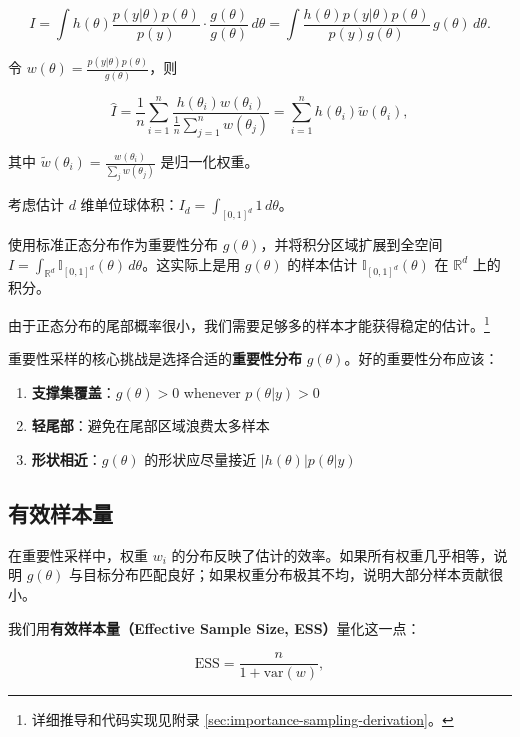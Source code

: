 \[
I = \int h(\theta) \frac{p(y | \theta) p(\theta)}{p(y)} \cdot \frac{g(\theta)}{g(\theta)} \, d\theta
    = \int \frac{h(\theta) p(y | \theta) p(\theta)}{p(y) g(\theta)} \, g(\theta) \, d\theta.
\]

令 $w(\theta) = \frac{p(y | \theta) p(\theta)}{g(\theta)}$，则

\[
\hat{I} = \frac{1}{n} \sum_{i=1}^n \frac{h(\theta_i) w(\theta_i)}{\frac{1}{n} \sum_{j=1}^n w(\theta_j)}
        = \sum_{i=1}^n h(\theta_i) \tilde{w}(\theta_i),
\]

其中 $\tilde{w}(\theta_i) = \frac{w(\theta_i)}{\sum_j w(\theta_j)}$ 是归一化权重。

\begin{Example}[10 维积分的重要性采样估计]\label{ex:importance-sampling-10d}
  考虑估计 $d$ 维单位球体积：$I_d = \int_{[0,1]^d} 1 \, d\theta$。

  使用标准正态分布作为重要性分布 $g(\theta)$，并将积分区域扩展到全空间 $I = \int_{\mathbb{R}^d} \mathbb{I}_{[0,1]^d}(\theta) \, d\theta$。这实际上是用 $g(\theta)$ 的样本估计 $\mathbb{I}_{[0,1]^d}(\theta)$ 在 $\mathbb{R}^d$ 上的积分。

  由于正态分布的尾部概率很小，我们需要足够多的样本才能获得稳定的估计。\footnote{详细推导和代码实现见附录 \cref{sec:importance-sampling-derivation}。}
\end{Example}

重要性采样的核心挑战是选择合适的\textbf{重要性分布} $g(\theta)$。好的重要性分布应该：
\begin{enumerate}
  \item \textbf{支撑集覆盖}：$g(\theta) > 0$ whenever $p(\theta | y) > 0$
  \item \textbf{轻尾部}：避免在尾部区域浪费太多样本
  \item \textbf{形状相近}：$g(\theta)$ 的形状应尽量接近 $|h(\theta)| p(\theta | y)$
\end{enumerate}

\subsection{有效样本量}

在重要性采样中，权重 $w_i$ 的分布反映了估计的效率。如果所有权重几乎相等，说明 $g(\theta)$ 与目标分布匹配良好；如果权重分布极其不均，说明大部分样本贡献很小。

我们用\textbf{有效样本量（Effective Sample Size, ESS）}量化这一点：

\[
\text{ESS} = \frac{n}{1 + \text{var}(w)},
\]

